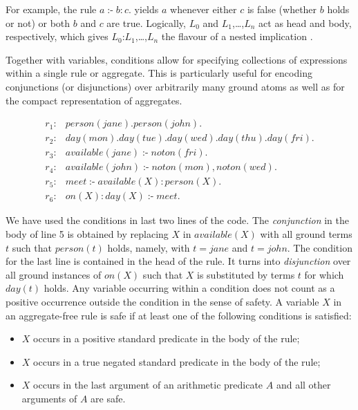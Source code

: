\documentclass[14pt,a4paper, titlepage]{article}
\DeclareMathOperator{\leftimpl}{:-}
\begin{document}
For example, the rule $\mathit{a \leftimpl b : c.}$ yields $a$ whenever either $c$ is false (whether $b$ holds or not) or both $b$ and $c$ are true. Logically, $L_0$ and $L_1$,\dots,$L_n$ act as head and body, respectively, which gives $L_0$:$L_1$,\dots,$L_n$ the flavour of a nested implication \cite{pott}.

Together  with variables, conditions allow for specifying collections of expressions within a single rule or aggregate. This is particularly useful for encoding conjunctions (or disjunctions) over arbitrarily many ground atoms as well as for the compact representation of aggregates. 
\begin{exmp}
\begin{align*}
r_1\colon& \mathit{person}(\mathit{jane}). \mathit{person}(\mathit{john}).\\
r_2\colon& \mathit{day}(\mathit{mon}). \mathit{day}(\mathit{tue}). \mathit{day}(\mathit{wed}). \mathit{day}(\mathit{thu}). \mathit{day}(\mathit{fri}). \\
r_3\colon& \mathit{available}(\mathit{jane}) \leftimpl not \mathit{on}(\mathit{fri}).\\
r_4\colon& \mathit{available}(\mathit{john}) \leftimpl \mathit{not} \mathit{on}(\mathit{mon}), \mathit{not} \mathit{on}(\mathit{wed}).\\
r_5\colon& \mathit{meet} \leftimpl \mathit{available}(X) : \mathit{person}(X).\\
r_6\colon& \mathit{on}(X) : \mathit{day}(X) \leftimpl \mathit{meet}.
\end{align*}
\end{exmp}  
We have used the conditions in last two lines of the code. The \emph{conjunction} in the body of line 5 is obtained by replacing $X$ in $\mathit{available(X)}$ with all ground terms $t$ such that $\mathit{person(t)}$ holds, namely, with $\mathit{t=jane}$ and $\mathit{t=john}$. The condition for the last line is contained in the head of the rule. It turns into \emph{disjunction} over all ground instances of $\mathit{on(X)}$ such that $X$ is substituted by terms $t$ for which $\mathit{day(t)}$ holds. Any variable occurring within a condition does not count as a positive occurrence outside the condition in the sense of safety. A variable $X$ in an aggregate-free rule is safe if at least one of the following conditions is satisfied:
\begin{itemize}
\item $X$ occurs in a positive standard predicate in the body of the rule;
\item $X$ occurs in a true negated standard predicate in the body of the rule;
\item $X$ occurs in the last argument of an arithmetic predicate $A$ and all other arguments of $A$ are safe.
\end{itemize}
\end{document}
